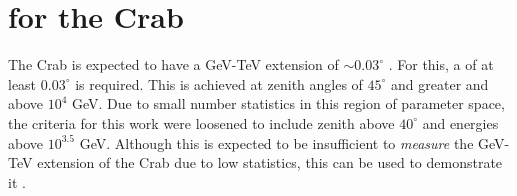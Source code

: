 \documentclass[main.tex]{subfiles}
\begin{document}



\section{\rse for the Crab}

The Crab is expected to have a GeV-TeV extension of $\sim 0.03^\circ$ \cite{Fermi_LAT_Crab_extension}\cite{HESS_Crab_extension}. For this, a \rse of at least $0.03^\circ$ is required. This is achieved at zenith angles of $45^\circ$ and greater and above $10^{4}$ GeV. Due to small number statistics in this region of parameter space, the criteria for this work were loosened to include zenith above $40^\circ$ and energies above $10^{3.5}$ GeV. Although this \rse is expected to be insufficient to \textit{measure} the GeV-TeV extension of the Crab due to low statistics, this can be used to demonstrate it \cite{Yeung:energy_extension}.
\end{document}
